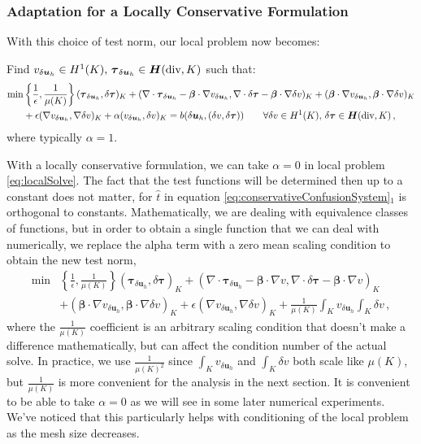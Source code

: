\documentclass[letterpaper]{article}
\def\btau{\boldsymbol\tau}
\def\bbeta{\boldsymbol\beta}
\newcommand{\bs}[1]{\boldsymbol{#1}}
\newcommand{\bfH}{\mbox{\boldmath $H$}}
\newcommand{\HdivK}{\bfH(\text{div},K)}
\newcommand{\HOneK}{H^{1}(K)}
\newcommand{\vdeltau}{v_{\delta\bs u_h}}
\newcommand{\taudeltau}{\btau_{\delta\bs u_h}}
\begin{document}
\subsubsection{Adaptation for a Locally Conservative Formulation}
With this choice of test norm, our local problem now becomes:

Find $\vdeltau\in\HOneK,\,\taudeltau\in\HdivK$ such that:
\begin{align}
\min&\left\{\frac{1}{\epsilon},\frac{1}{\mu(K)}\right\}(\taudeltau,\delta\btau)_K
+(\nabla\cdot\taudeltau-\bbeta\cdot\nabla
\vdeltau,\nabla\cdot\delta\btau-\bbeta\cdot\nabla\delta v)_K
+(\bbeta\cdot\nabla\vdeltau,\bbeta\cdot\nabla \delta v)_K\nonumber\\
&+\epsilon(\nabla\vdeltau,\nabla \delta v)_K
+\alpha(\vdeltau,\delta v)_K
=b(\delta\bs u_h,(\delta v,\delta\btau))
\quad\quad\forall\delta v\in\HOneK,\,\delta\btau\in\HdivK\,,
\label{eq:localSolve}
\end{align}
where typically $\alpha=1$.

With a locally conservative formulation, we can take $\alpha=0$ in local problem \eqref{eq:localSolve}. 
The fact that the test functions will be determined then up to a constant does not matter, for
$\hat t$ in equation \eqref{eq:conservativeConfusionSystem}$_1$ is orthogonal to constants.
Mathematically, we are dealing with equivalence classes of functions, but in
order to obtain a single function that we can deal with numerically, we
replace the alpha term with a zero mean scaling condition to obtain the new
test norm,
\begin{align}
\label{eq:localSolveMod}
\min&\left\{\frac{1}{\epsilon},\frac{1}{\mu(K)}\right\}(\taudeltau,\delta\btau)_K
+(\nabla\cdot\taudeltau-\bbeta\cdot\nabla
v,\nabla\cdot\delta\btau-\bbeta\cdot\nabla v)_K\\
&+(\bbeta\cdot\nabla\vdeltau,\bbeta\cdot\nabla \delta v)_K\nonumber
+\epsilon(\nabla\vdeltau,\nabla \delta v)_K
+\frac{1}{\mu(K)}\int_K\vdeltau\int_K\delta v\,,
\end{align}
where the $\frac{1}{\mu(K)}$ coefficient is an arbitrary scaling condition
that doesn't make a difference mathematically, but can affect the condition
number of the actual solve. In practice, we use $\frac{1}{\mu(K)^2}$
since $\int_K\vdeltau$ and $\int_K\delta v$ both scale like
$\mu(K)$, but $\frac{1}{\mu(K)}$ is more convenient for the analysis in the
next section.
It is convenient to be able to take $\alpha=0$ as we will see in
some later numerical experiments.
We've noticed that this particularly helps with conditioning of the local problem as the mesh size decreases.
\end{document}
